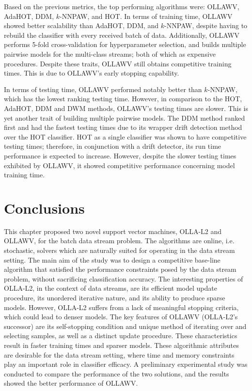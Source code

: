 \documentclass[reqno]{vcuthesis}
\numberwithin{equation}{chapter}
\begin{document}
Based on the previous metrics, the top performing algorithms were: OLLAWV, AdaHOT, DDM, $k$-NNPAW, and HOT. In terms of training time, OLLAWV showed better scalability than AdaHOT, DDM, and $k$-NNPAW, despite having to rebuild the classifier with every received batch of data. Additionally, OLLAWV performs 5-fold cross-validation for hyperparameter selection, and builds multiple pairwise models for the multi-class streams; both of which as expensive procedures. Despite these traits, OLLAWV still obtains competitive training times. This is due to OLLAWV's early stopping capability.

In terms of testing time, OLLAWV performed notably better than $k$-NNPAW, which has the lowest ranking testing time. However, in comparison to the HOT, AdaHOT, DDM and DWM methods, OLLAWV's testing times are slower. This is yet another trait of building multiple pairwise models. The DDM method ranked first and had the fastest testing times due to its wrapper drift detection method over the HOT classifier. HOT as a single classifier was shown to have competitive testing times; therefore, in conjunction with a drift detector, its run time performance is expected to increase. However, despite the slower testing times exhibited by OLLAWV, it showed competitive performance concerning model training time. 

\section{Conclusions}
This chapter proposed two novel support vector machines, OLLA-L2 and OLLAWV, for the batch data stream problem. The algorithms are online, i.e. stochastic, solvers which are naturally suited for operating in the data stream setting. The main aim of the study was to design a competitive base-line algorithm that satisfied the performance constraints posed by the data stream problem, without sacrificing classification accuracy. The interesting properties of OLLA-L2, in the context of data streams, are its efficient model update procedure, its unordered iterative nature, and its ability to produce sparse models. However, OLLA-L2 suffers from a lack of meaningful stopping criteria, which could lead to denser models. The key features of OLLAWV (OLLA-L2's successor) are its self-stopping condition and unique method of iterating over and selecting samples, as well as a distinct update procedure. These characteristics result in faster training times and sparser models. These algorithmic attributes are desirable for the data stream setting, where time and memory constraints play an important role in classifier efficacy. A preliminary experimental study was conducted to compare the performance of the two solutions, and the results showed the better performance of OLLAWV.
\end{document}
